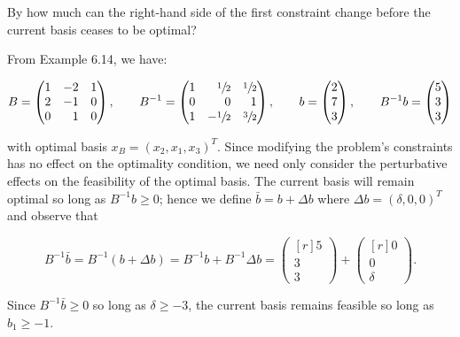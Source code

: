 By how much can the right-hand side of the first constraint change before the current basis ceases to be optimal?

\begin{solution}
  From Example 6.14, we have:

  $$
  B = \begin{pmatrix*}[r]
    1 & -2 & 1 \\
    2 & -1 & 0 \\
    0 &  1 & 0
  \end{pmatrix*}, \qquad B^{-1} = \begin{pmatrix*}[r]
    1 &  \sfrac{1}{2} & \sfrac{1}{2} \\
    0 &             0 &            1 \\
    1 & -\sfrac{1}{2} & \sfrac{3}{2} \\
  \end{pmatrix*}, \qquad b = \begin{pmatrix*}[r]
    2 \\
    7 \\
    3
  \end{pmatrix*}, \qquad B^{-1} b = \begin{pmatrix*}[r]
    5 \\
    3 \\
    3
  \end{pmatrix*}
  $$

  with optimal basis $x_B = \left( x_2, x_1, x_3 \right)^T$. Since modifying the problem's constraints has no effect on
  the optimality condition, we need only consider the perturbative effects on the feasibility of the optimal basis. The
  current basis will remain optimal so long as $B^{-1}b \ge 0$; hence we define $\bar{b} = b + \Delta b$ where 
  $\Delta b = (\delta, 0, 0)^T$ and observe that
  
  $$
  B^{-1}\bar{b} = B^{-1} \left( b + \Delta b \right) = B^{-1}b + B^{-1}\Delta b = \begin{pmatrix*}[r]
    5 \\
    3 \\
    3 
  \end{pmatrix*} + \begin{pmatrix*}[r]
    0 \\
    0 \\
    \delta
  \end{pmatrix*}.
  $$

  Since $B^{-1}\bar{b} \ge 0$ so long as $\delta \ge -3$, the current basis remains feasible so long as $b_1 \ge -1$.
  \ \\
\end{solution}
